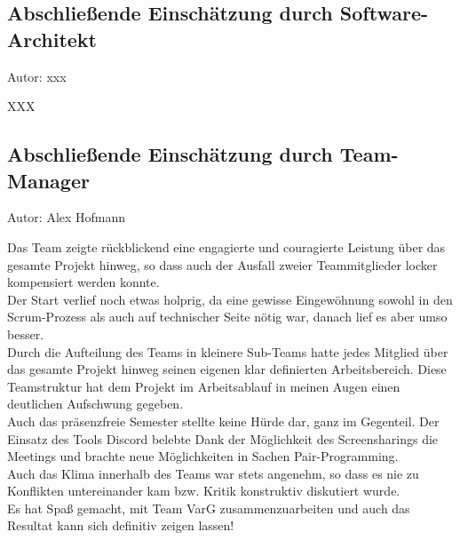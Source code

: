 \documentclass[twoside]{report}
\begin{document}
\subsection{Abschließende Einschätzung durch Software-Architekt}
{\small Autor: xxx}

XXX

\subsection{Abschließende Einschätzung durch Team-Manager}
{\small Autor: Alex Hofmann}

Das Team zeigte rückblickend eine engagierte und couragierte Leistung über das gesamte Projekt hinweg, so dass auch der Ausfall zweier Teammitglieder locker kompensiert werden konnte. \\
Der Start verlief noch etwas holprig, da eine gewisse Eingewöhnung sowohl in den Scrum-Prozess als auch auf technischer Seite nötig war, danach lief es aber umso besser. \\
Durch die Aufteilung des Teams in kleinere Sub-Teams hatte jedes Mitglied über das gesamte Projekt hinweg seinen eigenen klar definierten Arbeitsbereich. Diese Teamstruktur hat dem Projekt im Arbeitsablauf in meinen Augen einen deutlichen Aufschwung gegeben. \\
Auch das präsenzfreie Semester stellte keine Hürde dar, ganz im Gegenteil. Der Einsatz des Tools Discord belebte Dank der Möglichkeit des Screensharings die Meetings und brachte neue Möglichkeiten in Sachen Pair-Programming. \\
Auch das Klima innerhalb des Teams war stets angenehm, so dass es nie zu Konflikten untereinander kam bzw. Kritik konstruktiv diskutiert wurde. \\
Es hat Spaß gemacht, mit Team VarG zusammenzuarbeiten und auch das Resultat kann sich definitiv zeigen lassen!
\end{document}
